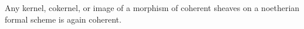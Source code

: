 Any kernel, cokernel, or image of a morphism of coherent sheaves on a noetherian formal scheme is again coherent.
